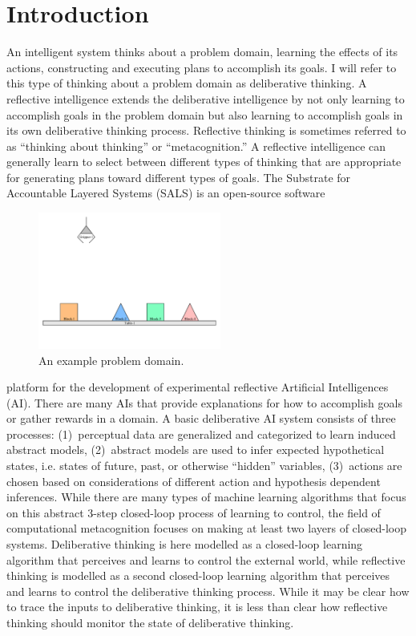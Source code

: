 \chapter{Introduction}
\label{chapter:introduction}

An intelligent system thinks about a problem domain, learning the
effects of its actions, constructing and executing plans to accomplish
its goals.  I will refer to this type of thinking about a problem
domain as deliberative thinking.  A reflective intelligence extends
the deliberative intelligence by not only learning to accomplish goals
in the problem domain but also learning to accomplish goals in its own
deliberative thinking process.  Reflective thinking is sometimes
referred to as ``thinking about thinking'' or ``metacognition.''  A
reflective intelligence can generally learn to select between
different types of thinking that are appropriate for generating plans
toward different types of goals.  The Substrate for Accountable
Layered Systems (SALS) is an open-source software
\begin{figure}
  \includegraphics[width=6cm]{gfx/blocks_world_large-01}
  \caption[An example problem domain.]{An example problem domain.}
  \label{figure:introduction_example_problem_domain}
\end{figure}
platform for the development of experimental reflective Artificial
Intelligences (AI).  There are many AIs that provide explanations for
how to accomplish goals or gather rewards in a domain.  A basic
deliberative AI system consists of three processes:
{\mbox{(1)~perceptual}} data are generalized and categorized to learn
induced abstract models, {\mbox{(2)~abstract}} models are used to
infer expected hypothetical states, i.e. states of future, past, or
otherwise ``hidden'' variables, {\mbox{(3)~actions}} are chosen based
on considerations of different action and hypothesis dependent
inferences.  While there are many types of machine learning algorithms
that focus on this abstract 3-step closed-loop process of learning to
control, the field of computational metacognition
\cite[]{cox_and_raja:2008,cox:2010} focuses on making at least two
layers of closed-loop systems.  Deliberative thinking is here modelled
as a closed-loop learning algorithm that perceives and learns to
control the external world, while reflective thinking is modelled as a
second closed-loop learning algorithm that perceives and learns to
control the deliberative thinking process.  While it may be clear how
to trace the inputs to deliberative thinking, it is less than clear
how reflective thinking should monitor the state of deliberative
thinking.

